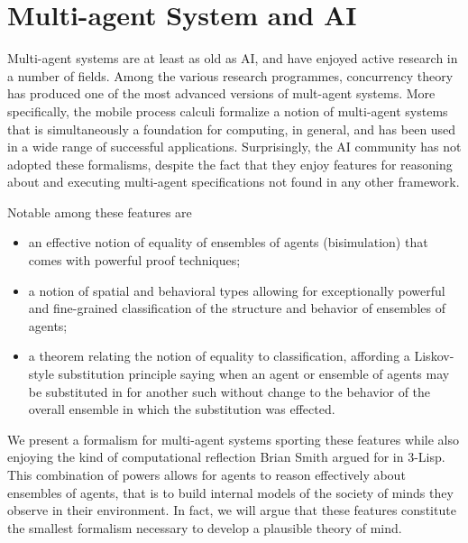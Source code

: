 \documentclass[runningheads]{llncs}
\begin{document}


\section{Multi-agent System and AI}
Multi-agent systems are at least as old as AI, and have enjoyed active
research in a number of fields. Among the various research programmes,
concurrency theory has produced one of the most advanced versions of
mult-agent systems. More specifically, the mobile process calculi
formalize a notion of multi-agent systems that is simultaneously a
foundation for computing, in general, and has been used in a wide
range of successful applications. Surprisingly, the AI community has
not adopted these formalisms, despite the fact that they enjoy
features for reasoning about and executing multi-agent specifications
not found in any other framework.

Notable among these features are
\begin{itemize}
  \item an effective notion of equality of ensembles of agents
    (bisimulation) that comes with powerful proof techniques;
  \item a notion of spatial and behavioral types allowing for
    exceptionally powerful and fine-grained classification of the
    structure and behavior of ensembles of agents;
  \item a theorem relating the notion of equality to classification,
    affording a Liskov-style substitution principle saying when an
    agent or ensemble of agents may be substituted in for another such
    without change to the behavior of the overall ensemble in which
    the substitution was effected.
\end{itemize}

We present a formalism for multi-agent systems sporting these features
while also enjoying the kind of computational reflection Brian Smith
argued for in 3-Lisp. This combination of powers allows for agents to
reason effectively about ensembles of agents, that is to build
internal models of the society of minds they observe in their
environment. In fact, we will argue that these features constitute
the smallest formalism necessary to develop a plausible theory of
mind.



\vspace{1\baselineskip}


\end{document}
